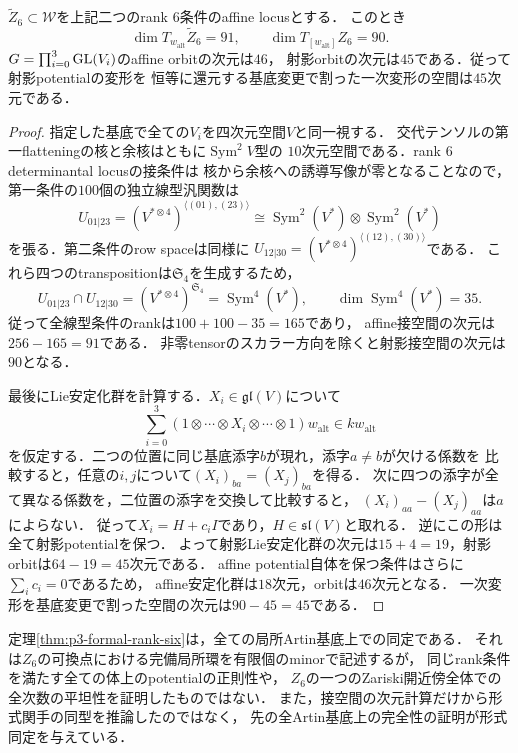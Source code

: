 \begin{proposition}[可換potential点の接空間と軌道]
\label{prop:p3-rank-six-tangent}
$\widetilde Z_6\subset\mathcal W$を上記二つのrank $6$条件のaffine locusとする．
このとき
\[
 \dim T_{w_{\mathrm{alt}}}\widetilde Z_6=91,
 \qquad
 \dim T_{[w_{\mathrm{alt}}]}Z_6=90.
\]
$G=\prod_{i=0}^3\mathrm{GL}(V_i)$のaffine orbitの次元は$46$，
射影orbitの次元は$45$である．従って射影potentialの変形を
恒等に還元する基底変更で割った一次変形の空間は$45$次元である．
\end{proposition}
\begin{proof}
指定した基底で全ての$V_i$を四次元空間$V$と同一視する．
交代テンソルの第一flatteningの核と余核はともに$\operatorname{Sym}^2V$型の
$10$次元空間である．rank $6$ determinantal locusの接条件は
核から余核への誘導写像が零となることなので，
第一条件の$100$個の独立線型汎関数は
\[
 U_{01|23}=
 (V^{*\otimes4})^{\langle(01),(23)\rangle}
 \cong\operatorname{Sym}^2(V^*)\otimes\operatorname{Sym}^2(V^*)
\]
を張る．第二条件のrow spaceは同様に
$U_{12|30}=(V^{*\otimes4})^{\langle(12),(30)\rangle}$である．
これら四つのtranspositionは$\mathfrak S_4$を生成するため，
\[
 U_{01|23}\cap U_{12|30}
   =(V^{*\otimes4})^{\mathfrak S_4}
   =\operatorname{Sym}^4(V^*),
 \qquad \dim\operatorname{Sym}^4(V^*)=35.
\]
従って全線型条件のrankは$100+100-35=165$であり，
affine接空間の次元は$256-165=91$である．
非零tensorのスカラー方向を除くと射影接空間の次元は$90$となる．

最後にLie安定化群を計算する．$X_i\in\mathfrak{gl}(V)$について
\[
 \sum_{i=0}^3
 (1\otimes\cdots\otimes X_i\otimes\cdots\otimes1)w_{\mathrm{alt}}
 \in k w_{\mathrm{alt}}
\]
を仮定する．二つの位置に同じ基底添字$b$が現れ，添字$a\ne b$が欠ける係数を
比較すると，任意の$i,j$について$(X_i)_{ba}=(X_j)_{ba}$を得る．
次に四つの添字が全て異なる係数を，二位置の添字を交換して比較すると，
$(X_i)_{aa}-(X_j)_{aa}$は$a$によらない．
従って$X_i=H+c_iI$であり，$H\in\mathfrak{sl}(V)$と取れる．
逆にこの形は全て射影potentialを保つ．
よって射影Lie安定化群の次元は$15+4=19$，射影orbitは$64-19=45$次元である．
affine potential自体を保つ条件はさらに$\sum_i c_i=0$であるため，
affine安定化群は$18$次元，orbitは$46$次元となる．
一次変形を基底変更で割った空間の次元は$90-45=45$である．
\end{proof}

\begin{remark}[形式模型の範囲]
定理\ref{thm:p3-formal-rank-six}は，全ての局所Artin基底上での同定である．
それは$Z_6$の可換点における完備局所環を有限個のminorで記述するが，
同じrank条件を満たす全ての体上のpotentialの正則性や，
$Z_6$の一つのZariski開近傍全体での全次数の平坦性を証明したものではない．
また，接空間の次元計算だけから形式関手の同型を推論したのではなく，
先の全Artin基底上の完全性の証明が形式同定を与えている．
\end{remark}

